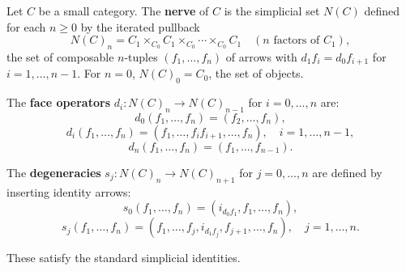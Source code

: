 Let $C$ be a small category. The \textbf{nerve} of $C$ is the simplicial set $N(C)$ defined for each $n \geq 0$ by the iterated pullback
$$
N(C)_n = C_1 \times_{C_0} C_1 \times_{C_0} \cdots \times_{C_0} C_1 \quad (n \text{ factors of } C_1),
$$
the set of composable $n$-tuples $(f_1, \ldots, f_n)$ of arrows with $d_1 f_i = d_0 f_{i+1}$ for $i = 1, \ldots, n-1$. For $n = 0$, $N(C)_0 = C_0$, the set of objects.

The \textbf{face operators} $d_i : N(C)_n \to N(C)_{n-1}$ for $i = 0, \ldots, n$ are:
$$
d_0(f_1, \ldots, f_n) = (f_2, \ldots, f_n),
$$
$$
d_i(f_1, \ldots, f_n) = (f_1, \ldots, f_i f_{i+1}, \ldots, f_n), \quad i = 1, \ldots, n-1,
$$
$$
d_n(f_1, \ldots, f_n) = (f_1, \ldots, f_{n-1}).
$$

The \textbf{degeneracies} $s_j : N(C)_n \to N(C)_{n+1}$ for $j = 0, \ldots, n$ are defined by inserting identity arrows:
$$
s_0(f_1, \ldots, f_n) = (i_{d_0 f_1}, f_1, \ldots, f_n),
$$
$$
s_j(f_1, \ldots, f_n) = (f_1, \ldots, f_j, i_{d_1 f_j}, f_{j+1}, \ldots, f_n), \quad j = 1, \ldots, n.
$$

These satisfy the standard simplicial identities.
